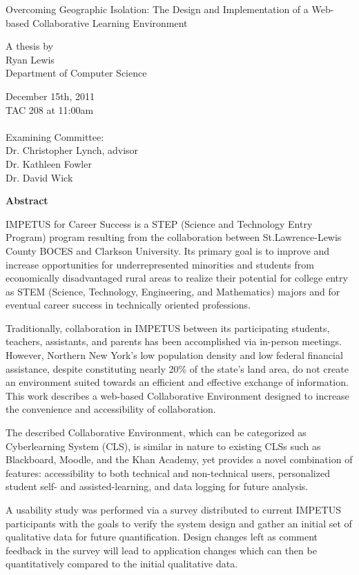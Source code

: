 \documentclass[letterpaper,12pt]{report}
\begin{document}
\thispagestyle{empty}
\begin{center}
\Large{Overcoming Geographic Isolation: The Design and Implementation of a Web-based Collaborative Learning Environment}

\vspace{.2in}
\normalsize{A thesis by}\\
\large{Ryan Lewis}\\
\normalsize{Department of Computer Science}

\vspace{.2in}
\normalsize{December 15th, 2011\\
TAC 208 at 11:00am\\ 
\ \\
Examining Committee:\\
Dr. Christopher Lynch, advisor\\
Dr. Kathleen Fowler\\
Dr. David Wick}
\end{center}
\begin{center}
\textbf{Abstract}
\end{center}

IMPETUS for Career Success is a STEP (Science and Technology Entry Program) program resulting from the collaboration between St.Lawrence-Lewis County BOCES and Clarkson University. Its primary goal is to improve and increase opportunities for underrepresented minorities and students from economically disadvantaged rural areas to realize their potential for college entry as STEM (Science, Technology, Engineering, and Mathematics) majors and for eventual career success in technically oriented professions.

Traditionally, collaboration in IMPETUS between its participating students, teachers, assistants, and parents has been accomplished via in-person meetings. However, Northern New York's low population density and low federal financial assistance, despite constituting nearly 20\% of the state's land area, do not create an environment suited towards an efficient and effective exchange of information. This work describes a web-based Collaborative Environment designed to increase the convenience and accessibility of collaboration.

The described Collaborative Environment, which can be categorized as Cyberlearning System (CLS), is similar in nature to existing CLSs such as Blackboard, Moodle, and the Khan Academy, yet provides a novel combination of features: accessibility to both technical and non-technical users, personalized student self- and assisted-learning, and data logging for future analysis.

A usability study was performed via a survey distributed to current IMPETUS participants with the goals to verify the system design and gather an initial set of qualitative data for future quantification. Design changes left as comment feedback in the survey will lead to application changes which can then be quantitatively compared to the initial qualitative data.
\end{document}
